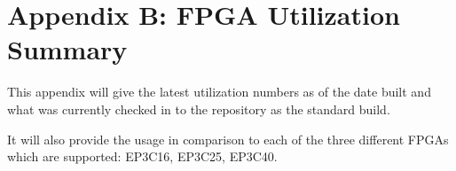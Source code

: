 \section{Appendix B: FPGA Utilization Summary} %
    This appendix will give the latest utilization numbers as of the date built and
    what was currently checked in to the repository as the standard build.
    
    It will also provide the usage in comparison to each of the three different
    FPGAs which are supported: EP3C16, EP3C25, EP3C40.
